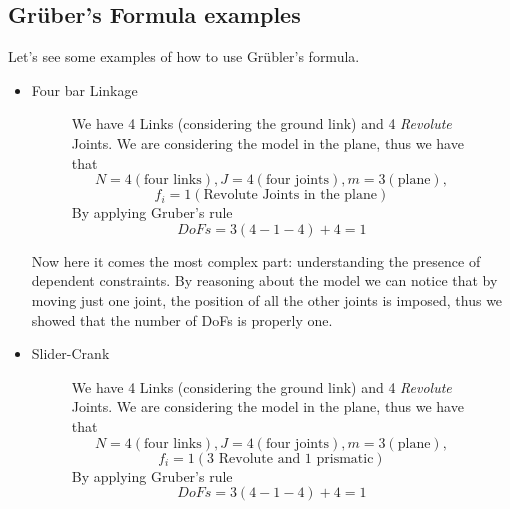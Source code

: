 \subsection{Gr\"{u}ber's Formula examples}
    Let's see some examples of how to use Gr\"{u}bler's formula.
    \begin{itemize}
    \item Four bar Linkage \\
    
    
 \begin{figure}[htbp!]
                \begin{minipage}{0.4\textwidth}
                    We have 4 Links (considering the ground link) and 4 \textit{Revolute} Joints. We are considering the model in the plane, thus we have that 
\[
 N=4 (\text{four links}), J = 4 (\text{four joints}), m = 3 (\text{plane}),
 \]\[ f_i = 1 (\text{Revolute Joints in the plane})              
                    \]   
                    By applying Gruber's rule
                    \[DoFs=3(4-1-4)+4 = 1\]
                 
                \end{minipage}\hfill
                \begin{minipage}{0.5\textwidth}
                    
                \end{minipage} 
            \end{figure} 
Now here it comes the most complex part: understanding the presence of dependent constraints. By reasoning about the model we can notice that by moving just one joint, the position of all the other joints is imposed, thus we showed that the number of DoFs is properly one.
\item Slider-Crank \\
   
 \begin{figure}[htbp!]
                \begin{minipage}{0.4\textwidth}
                    We have 4 Links (considering the ground link) and 4 \textit{Revolute} Joints. We are considering the model in the plane, thus we have that 
\[
 N=4 (\text{four links}), J = 4 (\text{four joints}), m = 3 (\text{plane}),
 \]\[ f_i = 1 (\text{3 Revolute and 1 prismatic})              
                    \]   
                    By applying Gruber's rule
                    \[DoFs=3(4-1-4)+4 = 1\]
                 
                \end{minipage}\hfill
                \begin{minipage}{0.5\textwidth}
                    
                \end{minipage} 
            \end{figure} 


\end{itemize}
